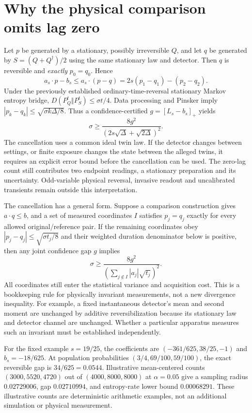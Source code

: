 \section{Why the physical comparison omits lag zero}
Let $p$ be generated by a stationary, possibly irreversible $Q$, and let
$q$ be generated by $S=(Q+Q^\dagger)/2$ using the same stationary law and
detector. Then $q$ is reversible and \emph{exactly} $p_0=q_0$. Hence
\begin{equation}
 a_s\cdot p-b_s\leq a_s\cdot(p-q)
 =2s(p_1-q_1)-(p_2-q_2).
 \label{eq:ci-joint-zero-cancels}
\end{equation}
Under the previously established ordinary-time-reversal stationary Markov
entropy bridge,
$D(P_Q^t\Vert P_S^t)\leq\sigma t/4$. Data processing and Pinsker imply
$|p_k-q_k|\leq\sqrt{\sigma k\Delta/8}$. Thus a confidence-certified
$g=[L_s-b_s]_+$ yields
\begin{equation}
 \boxed{\quad
 \sigma\geq\frac{8g^2}{(2s\sqrt{\Delta}+\sqrt{2\Delta})^2}.
 \quad}
 \label{eq:ci-joint-rate}
\end{equation}
The cancellation uses a common ideal twin law. If the detector changes
between settings, or finite exposure changes the state between the alleged
twins, it requires an explicit error bound before the cancellation can be
used. The zero-lag count still contributes two endpoint readings, a stationary
preparation and its uncertainty. Odd-variable physical reversal, invasive
readout and uncalibrated transients remain outside this interpretation.

The cancellation has a general form. Suppose a comparison construction gives
$a\cdot q\leq b$, and a set of measured coordinates $I$ satisfies
$p_j=q_j$ exactly for every allowed original/reference pair. If the remaining
coordinates obey $|p_j-q_j|\leq\sqrt{\sigma t_j/8}$ and their weighted
duration denominator below is positive, then any joint confidence gap $g$ implies
\[
 \sigma\geq\frac{8g^2}{(\sum_{j\notin I}|a_j|\sqrt{t_j})^2}.
\]
All coordinates still enter the statistical variance and acquisition cost.
This is a bookkeeping rule for physically invariant measurements, not a new
divergence inequality. For example, a fixed instantaneous detector's mean
and second moment are unchanged by additive reversibilization because its
stationary law and detector channel are unchanged. Whether a particular
apparatus measures such an invariant must be established independently.

For the fixed example $s=19/25$, the coefficients are
$(-361/625,38/25,-1)$ and $b_s=-18/625$. At population probabilities
$(3/4,69/100,59/100)$, the exact reversible gap is $34/625=0.0544$.
Illustrative mean-centered counts $(3000,5520,4720)$ out of
$(4000,8000,8000)$ at $\alpha=0.05$ give a sampling radius $0.02729006$,
gap $0.02710994$, and entropy-rate lower bound $0.00068291$. These
illustrative counts are deterministic arithmetic examples, not an additional
simulation or physical measurement.

